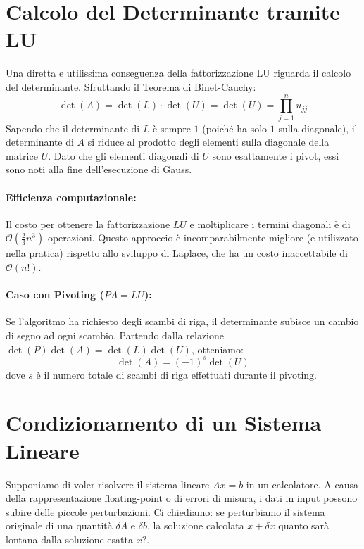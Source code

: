 \documentclass[a4paper,12pt]{article}
\begin{document}
	\section{Calcolo del Determinante tramite LU}
	
	Una diretta e utilissima conseguenza della fattorizzazione LU riguarda il calcolo del determinante. Sfruttando il Teorema di Binet-Cauchy:
	\begin{equation}
		\det(A) = \det(L) \cdot \det(U) = \det(U) = \prod_{j=1}^{n} u_{jj}
	\end{equation}
	Sapendo che il determinante di $L$ è sempre $1$ (poiché ha solo $1$ sulla diagonale), il determinante di $A$ si riduce al prodotto degli elementi sulla diagonale della matrice $U$. 
	Dato che gli elementi diagonali di $U$ sono esattamente i pivot, essi sono noti alla fine dell'esecuzione di Gauss.
	
	\paragraph{Efficienza computazionale:}
	Il costo per ottenere la fattorizzazione $LU$ e moltiplicare i termini diagonali è di $\mathcal{O}(\frac{2}{3}n^3)$ operazioni. Questo approccio è incomparabilmente migliore (e utilizzato nella pratica) rispetto allo sviluppo di Laplace, che ha un costo inaccettabile di $\mathcal{O}(n!)$.
	
	\paragraph{Caso con Pivoting ($PA=LU$):}
	Se l'algoritmo ha richiesto degli scambi di riga, il determinante subisce un cambio di segno ad ogni scambio. Partendo dalla relazione $\det(P)\det(A) = \det(L)\det(U)$, otteniamo:
	\begin{equation}
		\det(A) = (-1)^{s} \det(U)
	\end{equation}
	dove $s$ è il numero totale di scambi di riga effettuati durante il pivoting.
	
	\section{Condizionamento di un Sistema Lineare}
	
	Supponiamo di voler risolvere il sistema lineare $Ax = b$ in un calcolatore. A causa della rappresentazione floating-point o di errori di misura, i dati in input possono subire delle piccole perturbazioni. 
	Ci chiediamo: se perturbiamo il sistema originale di una quantità $\delta A$ e $\delta b$, la soluzione calcolata $x + \delta x$ quanto sarà lontana dalla soluzione esatta $x$?.
	
\end{document}
